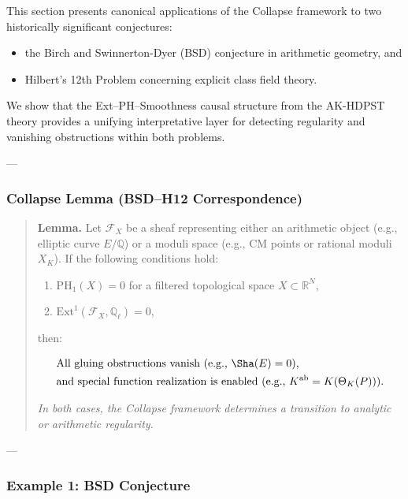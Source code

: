 \documentclass[11pt]{article}
\begin{document}
\begin{axiom}
\begin{axiom}
{{This section presents canonical applications of the Collapse framework  
to two historically significant conjectures:

\begin{itemize}
  \item the Birch and Swinnerton-Dyer (BSD) conjecture in arithmetic geometry, and
  \item Hilbert’s 12th Problem concerning explicit class field theory.
\end{itemize}

We show that the Ext–PH–Smoothness causal structure from the AK-HDPST theory  
provides a unifying interpretative layer for detecting regularity and vanishing obstructions  
within both problems.

---

\subsubsection*{Collapse Lemma (BSD–H12 Correspondence)}

\begin{quote}
\textbf{Lemma.}  
Let \( \mathcal{F}_X \) be a sheaf representing either an arithmetic object (e.g., elliptic curve \( E/\mathbb{Q} \))  
or a moduli space (e.g., CM points or rational moduli \( X_K \)).  
If the following conditions hold:

\begin{enumerate}
  \item \( \mathrm{PH}_1(X) = 0 \) for a filtered topological space \( X \subset \mathbb{R}^N \),
  \item \( \mathrm{Ext}^1(\mathcal{F}_X, \mathbb{Q}_\ell) = 0 \),
\end{enumerate}

then:

\[
\begin{aligned}
& \text{All gluing obstructions vanish (e.g., } \Sha(E) = 0 \text{),} \\
& \text{and special function realization is enabled (e.g., } 
K^{\mathrm{ab}} = K(\Theta_K(P)) \text{).}
\end{aligned}
\]

\textit{In both cases, the Collapse framework determines a transition to analytic or arithmetic regularity.}
\end{quote}

---

\subsubsection*{Example 1: BSD Conjecture}

}}
\end{axiom}
\end{axiom}
\end{document}
